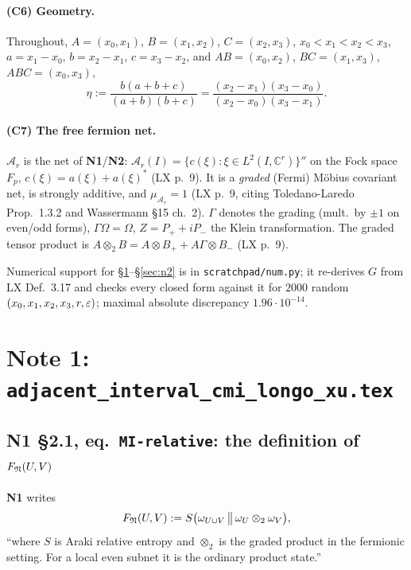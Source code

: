 \documentclass[11pt]{article}
\newcommand{\Ar}{\mathcal A_r}
\newcommand{\NI}{\textbf{N1}}
\newcommand{\NII}{\textbf{N2}}
\newcommand{\loc}[1]{{\small\texttt{#1}}}
\newcommand{\1}{\mathbf 1}
\begin{document}
\paragraph{(C6) Geometry.} Throughout,
$A=(x_0,x_1)$, $B=(x_1,x_2)$, $C=(x_2,x_3)$, $x_0<x_1<x_2<x_3$,
$a=x_1-x_0$, $b=x_2-x_1$, $c=x_3-x_2$, and
$AB=(x_0,x_2)$, $BC=(x_1,x_3)$, $ABC=(x_0,x_3)$,
\begin{equation}\label{eq:etadef}
 \eta:=\frac{b(a+b+c)}{(a+b)(b+c)}=\frac{(x_2-x_1)(x_3-x_0)}{(x_2-x_0)(x_3-x_1)} .
\end{equation}

\paragraph{(C7) The free fermion net.}
$\Ar$ is the net of \NI/\NII: $\Ar(I)=\{c(\xi):\xi\in L^2(I,\mathbb C^r)\}''$ on the Fock space $F_p$,
$c(\xi)=a(\xi)+a(\xi)^*$ (LX p.~9). It is a \emph{graded} (Fermi) M\"obius covariant net, is strongly
additive, and $\mu_{\Ar}=1$ (LX p.~9, citing Toledano-Laredo Prop.~1.3.2 and Wassermann \S15 ch.~2).
$\Gamma$ denotes the grading (mult.\ by $\pm1$ on even/odd forms), $\Gamma\Omega=\Omega$,
$Z=P_++iP_-$ the Klein transformation. The graded tensor product is
$A\otimes_2B=A\otimes B_++A\Gamma\otimes B_-$ (LX p.~9).

\medskip
\noindent Numerical support for \S\ref{sec:n1}--\S\ref{sec:n2} is in
\loc{scratchpad/num.py}; it re-derives $G$ from LX Def.~3.17 and checks every closed
form against it for $2000$ random $(x_0,x_1,x_2,x_3,r,\varepsilon)$; maximal absolute discrepancy $1.96\cdot10^{-14}$.

\section{Note 1: \texorpdfstring{\loc{adjacent\_interval\_cmi\_longo\_xu.tex}}{Note 1}}\label{sec:n1}

\subsection{N1 \S2.1, eq.\ \loc{MI-relative}: the definition of \texorpdfstring{$F_{\mathfrak N}(U,V)$}{F(U,V)}}

\NI{} writes
\[
 F_{\mathfrak N}(U,V):=S\bigl(\omega_{U\cup V}\,\big\|\,\omega_U\otimes_2\omega_V\bigr),
\]
``where $S$ is Araki relative entropy and $\otimes_2$ is the graded product in the fermionic setting.
For a local even subnet it is the ordinary product state.''
\end{document}

